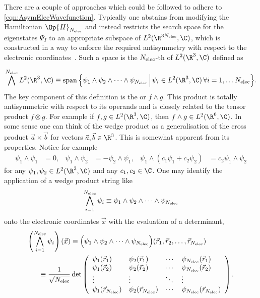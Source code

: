 There are a couple of approaches which could be followed
to adhere to \eqref{eqn:AsymElecWavefunction}.
Typically one abstains from modifying the Hamiltonian $\Op{H}_{\Nelec}$
and instead restricts the search space for the eigenstates $\Psi_I$
to an appropriate subspace of $L^2(\R^{3\Nelec}, \C)$,
which is constructed in a way
to enforce the required
antisymmetry with respect to the electronic coordinates~\cite{Dirac1926,Fock1930}.
Such a space is the $N_\text{elec}$-th  of $L^2(\R^3, \C)$ defined as
\newcommand{\wedgestring}{\psi_1 \wedge \psi_2 \wedge \cdots \wedge \psi_{\Nelec}}

\begin{equation}
	\bigwedge^{\Nelec} L^2(\R^3, \C)
	\equiv \spacespan \Big\{ \wedgestring
	\, \Big| \, \psi_i \in L^2(\R^3, \C) \, \forall i = 1, \ldots \Nelec \Big\}.
	\label{eqn:DefExteriorPower}
\end{equation}
The key component of this definition is the 
or  $f \wedge g$.
This product is totally antisymmetric with respect to its operands
and is closely related to the tensor product $f \otimes g$.
For example if $f, g \in L^2(\R^3, \C)$, then $f \wedge g \in L^2(\R^6, \C)$.
In some sense one can think of the wedge product
as a generalisation of the  cross product $\vec{a} \times \vec{b}$
for vectors $\vec{a}, \vec{b} \in \R^3$.
This is somewhat apparent from its properties.
Notice for example
\begin{align}
	\label{eqn:PropertiesExteriorProduct}
	\psi_1 \wedge \psi_1 &= 0, &\psi_1 \wedge \psi_2 &= -\psi_2 \wedge \psi_1, &
	\psi_1 \wedge (c_1 \psi_1 + c_2 \psi_2) &= c_2 \psi_1 \wedge \psi_2
\end{align}
for any $\psi_1, \psi_2 \in L^2(\R^3, \C)$ and any $c_1, c_2 \in \C$.
One may identify the application of a wedge product string like
\[ \bigwedge_{i=1}^{\Nelec} \psi_i \equiv \wedgestring \]
onto the electronic coordinates $\vec{x}$
with the evaluation of a determinant, \ie
\begin{align*}
	\left( \bigwedge_{i=1}^{\Nelec} \psi_i \right) (\vec{x})
	&\equiv \Big(\wedgestring\Big) (\vec{r}_1, \vec{r}_2, \ldots, \vec{r}_{\Nelec}) \\
	\equiv \frac{1}{\sqrt{\Nelec}} &\det
	\left(
	\begin{array}{*{6}{l}}
		\psi_1(\vec{r}_1) & \psi_2(\vec{r}_1) & \cdots & \psi_{\Nelec}(\vec{r}_1) \\
		\psi_1(\vec{r}_2) & \psi_2(\vec{r}_2) & \cdots & \psi_{\Nelec}(\vec{r}_2) \\
		\vdots & \vdots & \ddots & \vdots \\
		\psi_1(\vec{r}_{\Nelec}) & \psi_2(\vec{r}_{\Nelec}) & \cdots & \psi_{\Nelec}(\vec{r}_{\Nelec}) \\
	\end{array}
	\right).
\end{align*}
